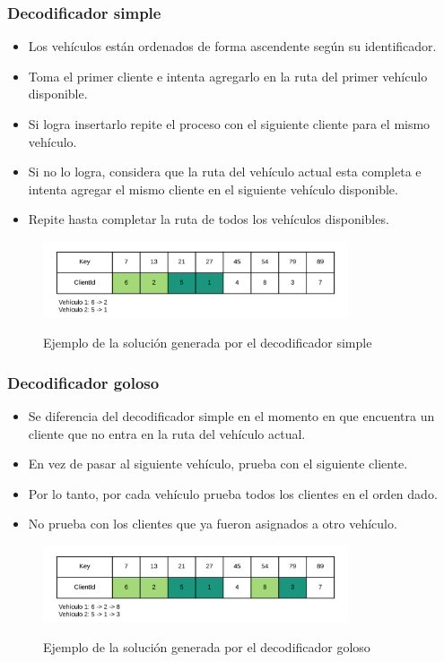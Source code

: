 \documentclass{beamer}
\begin{document}
\begin{frame}
\frametitle{Decodificador simple}

\begin{itemize}
    \item Los vehículos están ordenados de forma ascendente según su identificador.
    \item Toma el primer cliente e intenta agregarlo en la ruta del primer vehículo disponible.
    \item Si logra insertarlo repite el proceso con el siguiente cliente para el mismo vehículo.
    \item Si no lo logra, considera que la ruta del vehículo actual esta completa e intenta agregar el mismo cliente en el siguiente vehículo disponible.
    \item Repite hasta completar la ruta de todos los vehículos disponibles.
    \pause
\end{itemize}

\begin{figure}[h]
	\caption{Ejemplo de la solución generada por el decodificador simple}
	\centering
	\includegraphics[width=9cm]{DistribucionClientesDecoSimple}
	\label{fig:DistribucionClientesDecoSimple}
\end{figure}

\end{frame}


\begin{frame}
\frametitle{Decodificador goloso}

\begin{itemize}
    \item Se diferencia del decodificador simple en el momento en que encuentra un cliente que no entra en la ruta del vehículo actual.
    \item En vez de pasar al siguiente vehículo, prueba con el siguiente cliente.
    \item Por lo tanto, por cada vehículo prueba todos los clientes en el orden dado.
    \item No prueba con los clientes que ya fueron asignados a otro vehículo.
    \pause
\end{itemize}

\begin{figure}[h]
	\caption{Ejemplo de la solución generada por el decodificador goloso}
	\centering
	\includegraphics[width=9cm]{DistribucionClientesDecoGoloso}
	\label{fig:DistribucionClientesDecoGoloso}
\end{figure}

\end{frame}
\end{document}
